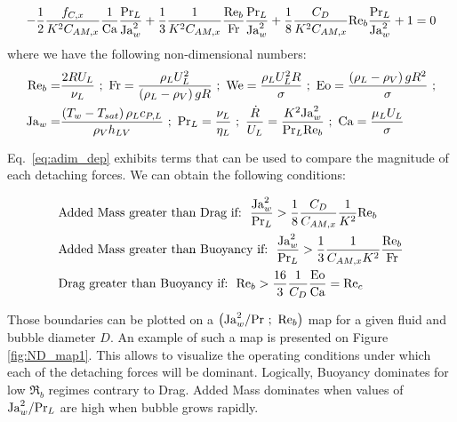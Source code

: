 \begin{equation}
\label{eq:adim_dep}
-\frac{1}{2}\frac{f_{C,x}}{K^{2}C_{AM,x}}\frac{1}{\mathrm{Ca}}\frac{\mathrm{Pr}_{L}}{\mathrm{Ja}_{w}^{2}} +  \frac{1}{3}\frac{1}{K^{2}C_{AM,x}}\frac{\mathrm{Re}_{b}}{\mathrm{Fr}}\frac{\mathrm{Pr}_{L}}{\mathrm{Ja}_{w}^{2}} + \frac{1}{8}\frac{C_{D}}{K^{2}C_{AM,x}}\mathrm{Re}_{b}\frac{\mathrm{Pr}_{L}}{\mathrm{Ja}_{w}^{2}} +1 =0
\end{equation}
where we have the following non-dimensional numbers:
\begin{align}
\nonumber \Re_{b} =& \frac{2RU_{L}}{\nu_{L}}\ ;\ \Fr=\frac{\rho_{L}U_{L}^{2}}{\parth{\rho_{L}-\rho_{V}}g R}\ ;\ \We=\frac{\rho_{L}U_{L}^{2}R}{\sigma}\ ; \ \Eo=\frac{\parth{\rho_{L}-\rho_{V}}g R^{2}}{\sigma}\ ;\\
%
\nonumber \Ja_{w}=&\frac{\parth{T_{w}-T_{sat}}\rho_{L} c_{P,L}}{\rho_{V} h_{LV}}\ ;\ \Pr_{L}=\frac{\nu_{L}}{\eta_{L}}\ ;\ \frac{\dot{R}}{U_{L}}=\frac{K^{2}\Ja_{w}^{2}}{\Pr_{L} \Re_{b}}\ ;\ \Ca=\frac{\mu_{L}U_{L}}{\sigma}
\end{align}


Eq.~\ref{eq:adim_dep} exhibits terms that can be used to compare the magnitude of each detaching forces. We can obtain the following conditions:

\begin{align}
&\text{Added Mass greater than Drag if:}\ \ \frac{\mathrm{Ja}_{w}^{2}}{\mathrm{Pr}_{L}}>\frac{1}{8}\frac{C_{D}}{C_{AM,x}}\frac{1}{K^{2}}\mathrm{Re}_{b} \label{eq:AMvsD}\\
&\text{Added Mass greater than Buoyancy if:}\ \  \frac{\mathrm{Ja}_{w}^{2}}{\mathrm{Pr}_{L}}>\frac{1}{3}\frac{1}{C_{AM,x}K^{2}}\frac{\mathrm{Re}_{b}}{\mathrm{Fr}} \label{eq:AMvsB}\\
&\text{Drag greater than Buoyancy if:}\ \  \mathrm{Re}_{b}>\frac{16}{3}\frac{1}{C_{D}}\frac{\mathrm{Eo}}{\mathrm{Ca}}=\mathrm{Re}_{c} \label{eq:DvsB}
\end{align}


Those boundaries can be plotted on a $\left( \mathrm{Ja}_{w}^{2}/\mathrm{Pr}\ ;\ \mathrm{Re}_{b} \right)$ map for a given fluid and bubble diameter $D$. An example of such a map is presented on Figure \ref{fig:ND_map1}. This allows to visualize the operating conditions under which each of the detaching forces will be dominant. Logically, Buoyancy dominates for low $\Re_{b}$ regimes contrary to Drag. Added Mass dominates when values of $\mathrm{Ja}_{w}^{2}/\mathrm{Pr}_{L}$ are high \ie when bubble grows rapidly.





